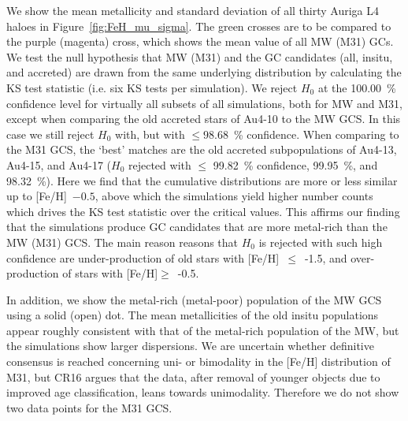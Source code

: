 \documentclass[a4paper,fleqn,usenatbib]{mnras}
\begin{document}
We show the mean metallicity and standard deviation of all thirty Auriga L4 haloes
in Figure~\ref{fig:FeH_mu_sigma}. The green crosses are to be compared to the
purple (magenta) cross, which shows the mean value of all MW (M31) GCs.
We test the null hypothesis that MW (M31) and the GC candidates (all, insitu, and
accreted) are drawn from the same underlying distribution by calculating the KS
test statistic (i.e. six KS tests per simulation). We reject $H_0$ at the 100.00~\%
confidence level for virtually all subsets of all simulations, both for MW and M31,
except when comparing the old accreted stars of \mbox{Au4-10} to the MW GCS. In this
case we still reject $H_0$ with, but with $\leq 98.68$~\% confidence. When comparing
to the M31 GCS, the `best' matches are the old accreted subpopulations of \mbox{Au4-13},
\mbox{Au4-15}, and \mbox{Au4-17} ($H_0$ rejected with $\leq$ 99.82~\% confidence, 99.95~\%,
and 98.32~\%). Here we find that the cumulative distributions are more or less
similar up to [Fe/H]~$-0.5$, above which the simulations yield higher number
counts which drives the KS test statistic over the critical values. This affirms
our finding that the simulations produce GC candidates that are more metal-rich
than the MW (M31) GCS. The main reason reasons that $H_0$ is rejected with such
high confidence are under-production of old stars with [Fe/H]~$\leq$~-1.5,
and over-production of stars with [Fe/H]$\geq$~-0.5.

In addition, we show the metal-rich (metal-poor) population of the MW GCS using
a solid (open) dot. The mean metallicities of the old insitu populations appear
roughly consistent with that of the metal-rich population of the MW, but the
simulations show larger dispersions. We are uncertain whether definitive consensus
is reached concerning uni- or bimodality in the [Fe/H] distribution of M31, but
CR16 argues that the data, after removal of younger objects due to improved age
classification, leans towards unimodality. Therefore we do not show two data
points for the M31 GCS.
\end{document}
